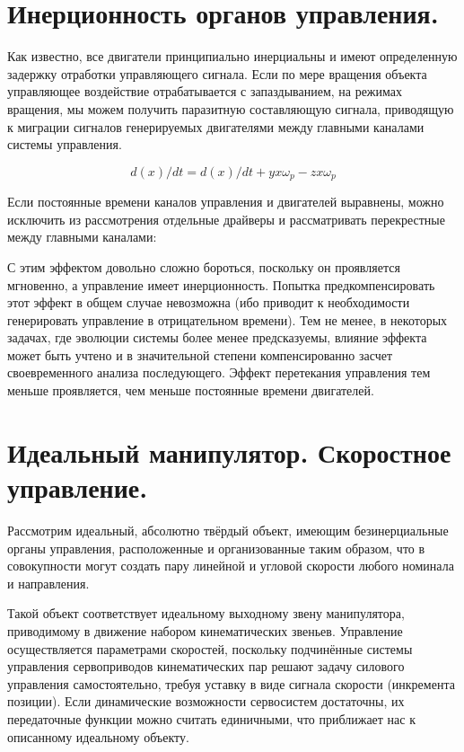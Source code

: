 \documentclass[a4paper]{article}
\begin{document}
\section{Инерционность органов управления.}
Как известно, все двигатели принципиально инерциальны и имеют определенную задержку отработки управляющего сигнала. Если по мере вращения объекта управляющее воздействие отрабатывается с запаздыванием, на режимах вращения, мы можем получить паразитную составляющую сигнала, приводящую к миграции сигналов генерируемых двигателями между главными каналами системы управления. 

\begin{equation}
d(x)/dt = d(x)/dt + y x \omega_p - z x \omega_p 
\end{equation}

Если постоянные времени каналов управления и двигателей выравнены, можно исключить из рассмотрения отдельные драйверы и рассматривать перекрестные между главными каналами:



С этим эффектом довольно сложно бороться, поскольку он проявляется мгновенно, а управление имеет инерционность. Попытка предкомпенсировать этот эффект в общем случае невозможна (ибо приводит к необходимости генерировать управление в отрицательном времени). Тем не менее, в некоторых задачах, где эволюции системы более менее предсказуемы, влияние эффекта может быть учтено и в значительной степени компенсированно засчет своевременного анализа последующего. Эффект перетекания управления тем меньше проявляется, чем меньше постоянные времени двигателей. 

\section{Идеальный манипулятор. Скоростное управление.}
Рассмотрим идеальный, абсолютно твёрдый объект, имеющим безинерциальные органы управления, расположенные и организованные таким образом, что в совокупности могут создать пару линейной и угловой скорости любого номинала и направления.

Такой объект соответствует идеальному выходному звену манипулятора, приводимому в движение набором кинематических звеньев. Управление осуществляется параметрами скоростей, поскольку подчинённые системы управления сервоприводов кинематических пар решают задачу силового управления самостоятельно, требуя уставку в виде сигнала скорости (инкремента позиции). Если динамические возможности сервосистем достаточны, их передаточные функции можно считать единичными, что приближает нас к описанному идеальному объекту.
\end{document}
